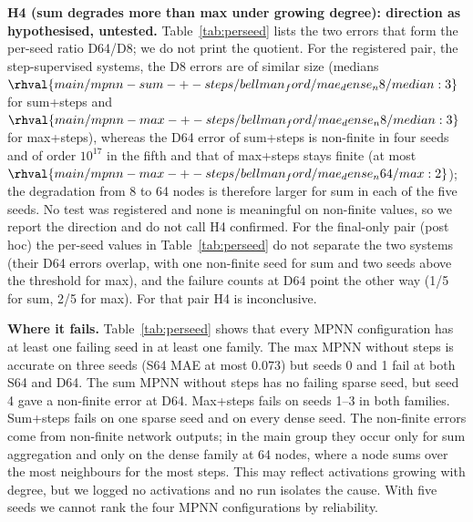 \textbf{H4 (sum degrades more than max under growing degree): direction as hypothesised, untested.} Table~\ref{tab:perseed} lists the two errors that form the per-seed ratio D64/D8; we do not print the quotient. For the registered pair, the step-supervised systems, the D8 errors are of similar size (medians $\rhval{main/mpnn-sum-+-steps/bellman_ford/mae_dense_n8/median:3}$ for sum+steps and $\rhval{main/mpnn-max-+-steps/bellman_ford/mae_dense_n8/median:3}$ for max+steps), whereas the D64 error of sum+steps is non-finite in four seeds and of order $10^{17}$ in the fifth and that of max+steps stays finite (at most $\rhval{main/mpnn-max-+-steps/bellman_ford/mae_dense_n64/max:2}$); the degradation from 8 to 64 nodes is therefore larger for sum in each of the five seeds. No test was registered and none is meaningful on non-finite values, so we report the direction and do not call H4 confirmed. For the final-only pair (post hoc) the per-seed values in Table~\ref{tab:perseed} do not separate the two systems (their D64 errors overlap, with one non-finite seed for sum and two seeds above the threshold for max), and the failure counts at D64 point the other way (1/5 for sum, 2/5 for max). For that pair H4 is inconclusive.

\textbf{Where it fails.} Table~\ref{tab:perseed} shows that every MPNN configuration has at least one failing seed in at least one family. The max MPNN without steps is accurate on three seeds (S64 MAE at most $0.073$) but seeds 0 and 1 fail at both S64 and D64. The sum MPNN without steps has no failing sparse seed, but seed 4 gave a non-finite error at D64. Max+steps fails on seeds 1--3 in both families. Sum+steps fails on one sparse seed and on every dense seed. The non-finite errors come from non-finite network outputs; in the main group they occur only for sum aggregation and only on the dense family at 64 nodes, where a node sums over the most neighbours for the most steps. This may reflect activations growing with degree, but we logged no activations and no run isolates the cause. With five seeds we cannot rank the four MPNN configurations by reliability.
